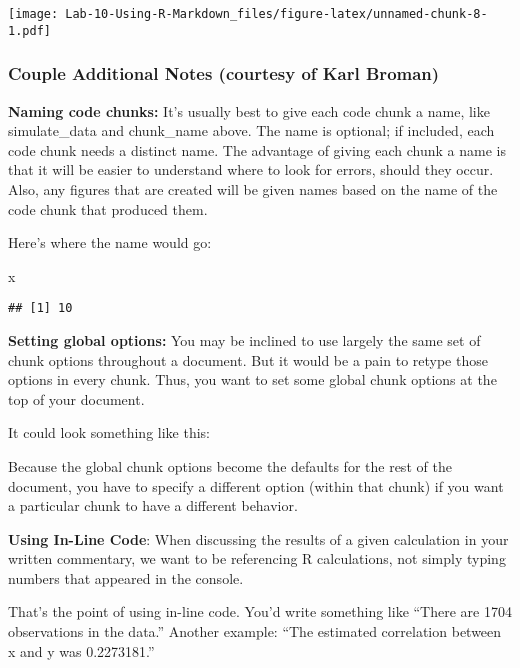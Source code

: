 \documentclass[]{article}
\newenvironment{Shaded}{\begin{snugshade}}{\end{snugshade}}
\newcommand{\DataTypeTok}[1]{\textcolor[rgb]{0.13,0.29,0.53}{#1}}
\newcommand{\KeywordTok}[1]{\textcolor[rgb]{0.13,0.29,0.53}{\textbf{#1}}}
\newcommand{\NormalTok}[1]{#1}
\newcommand{\OperatorTok}[1]{\textcolor[rgb]{0.81,0.36,0.00}{\textbf{#1}}}
\newcommand{\OtherTok}[1]{\textcolor[rgb]{0.56,0.35,0.01}{#1}}
\begin{document}
\texttt{[image: Lab-10-Using-R-Markdown\_files/figure-latex/unnamed-chunk-8-1.pdf]}

\hypertarget{couple-additional-notes-courtesy-of-karl-broman}{%
\subsubsection{Couple Additional Notes (courtesy of Karl
Broman)}\label{couple-additional-notes-courtesy-of-karl-broman}}

\textbf{Naming code chunks:} It's usually best to give each code chunk a
name, like simulate\_data and chunk\_name above. The name is optional;
if included, each code chunk needs a distinct name. The advantage of
giving each chunk a name is that it will be easier to understand where
to look for errors, should they occur. Also, any figures that are
created will be given names based on the name of the code chunk that
produced them.

Here's where the name would go:

\begin{Shaded}
\begin{Highlighting}[]
\NormalTok{x}
\end{Highlighting}
\end{Shaded}

\begin{verbatim}
## [1] 10
\end{verbatim}

\textbf{Setting global options:} You may be inclined to use largely the
same set of chunk options throughout a document. But it would be a pain
to retype those options in every chunk. Thus, you want to set some
global chunk options at the top of your document.

It could look something like this:

\begin{Shaded}
\end{Shaded}

Because the global chunk options become the defaults for the rest of the
document, you have to specify a different option (within that chunk) if
you want a particular chunk to have a different behavior.

\textbf{Using In-Line Code}: When discussing the results of a given
calculation in your written commentary, we want to be referencing R
calculations, not simply typing numbers that appeared in the console.

That's the point of using in-line code. You'd write something like
``There are 1704 observations in the data.'' Another example: ``The
estimated correlation between x and y was 0.2273181.''
\end{document}
